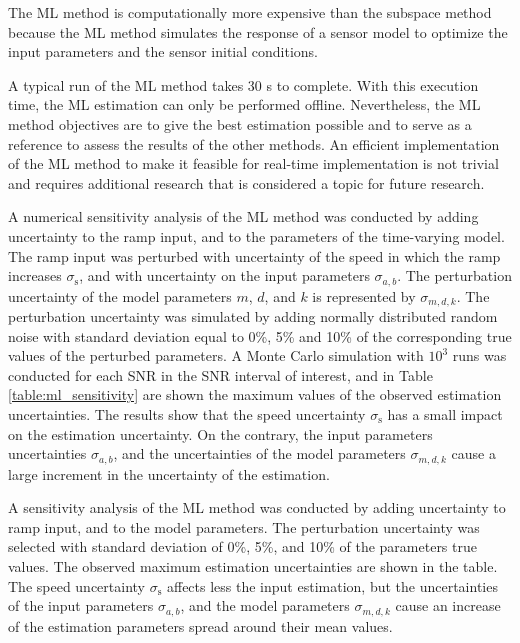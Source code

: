 {{The ML method is computationally more expensive than the subspace method because the ML method simulates the response of a sensor model to optimize the input parameters and the sensor initial conditions.

A typical run of the ML method takes 30 s to complete.
With this execution time, the ML estimation can only be performed offline.
Nevertheless, the ML method objectives are to give the best estimation possible and to serve as a reference to assess the results of the other methods.
An efficient implementation of the ML method to make it feasible for real-time implementation is not trivial and requires additional research that is considered a topic for future research.

A numerical sensitivity analysis of the ML method was conducted by adding uncertainty to the ramp input, and to the parameters of the time-varying model. 
The ramp input was perturbed with uncertainty of the speed in which the ramp increases $\sigma_{\mathrm{s}}$, and with uncertainty on the input parameters $\sigma_{a,b}$. 
The perturbation uncertainty of the model parameters $m$, $d$, and $k$ is represented by $\sigma_{m,d,k}$. 
The perturbation uncertainty was simulated by adding normally distributed random noise with standard deviation equal to 0\%, 5\% and 10\% of the corresponding true values of the perturbed parameters.
A Monte Carlo simulation with $10^3$ runs was conducted for each SNR in the SNR interval of interest, and in Table \ref{table:ml_sensitivity} are shown the maximum values of the observed estimation uncertainties. 
The results show that the speed uncertainty $\sigma_{\mathrm{s}}$ has a small impact on the estimation uncertainty.
On the contrary, the input parameters uncertainties $\sigma_{a,b}$, and the uncertainties of the model parameters $\sigma_{m,d,k}$ cause a large increment in the uncertainty of the estimation.

\begin{table}[h!]
\centering
\caption{ A sensitivity analysis of the ML method was conducted by adding uncertainty to ramp input, and to the model parameters. The perturbation uncertainty was selected with standard deviation of 0\%, 5\%, and 10\% of the parameters true values. The observed maximum estimation uncertainties are shown in the table. The speed uncertainty $\sigma_{\mathrm{s}}$ affects less the input estimation, but the uncertainties of the input parameters $\sigma_{a,b}$, and the model parameters $\sigma_{m,d,k}$ cause an increase of the estimation parameters spread around their mean values.}
 

\end{table}}}
